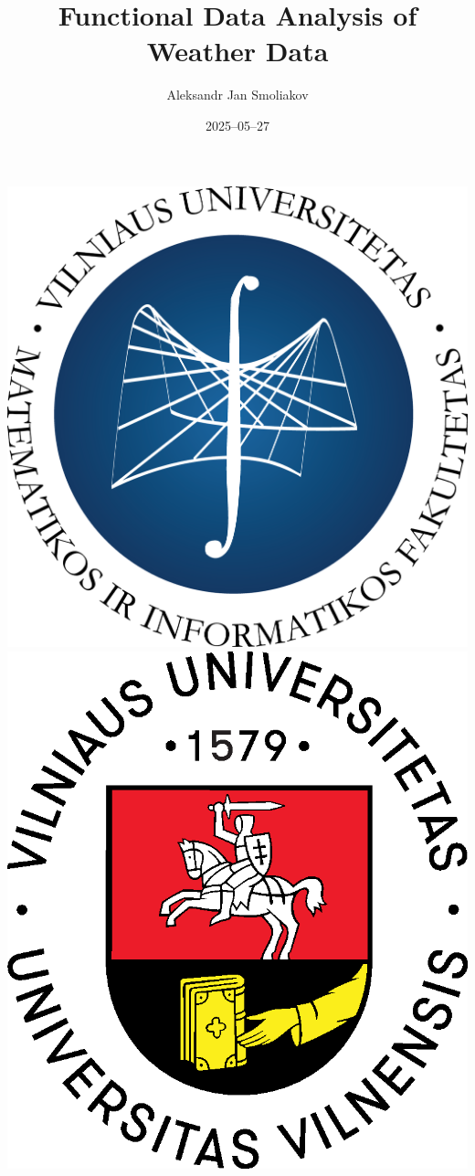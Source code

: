 \documentclass[svgnames, 12pt]{beamer}
\title[FDA of Weather Data]{Functional Data Analysis of Weather Data}%
\author[A. J. Smoliakov]{Aleksandr Jan Smoliakov\inst{1}}
\institute[VU MIF]{\inst{1} Vilnius University, Faculty of Mathematics and Informatics}
\date{2025--05--27}
\begin{document}
\begin{frame}
\includegraphics[scale=0.15]{MIF Garamond-logo.png} 
\hfill
\includegraphics[scale=0.15]{Logo_spalvotas.eps}

\titlepage
\end{frame}
\end{document}
